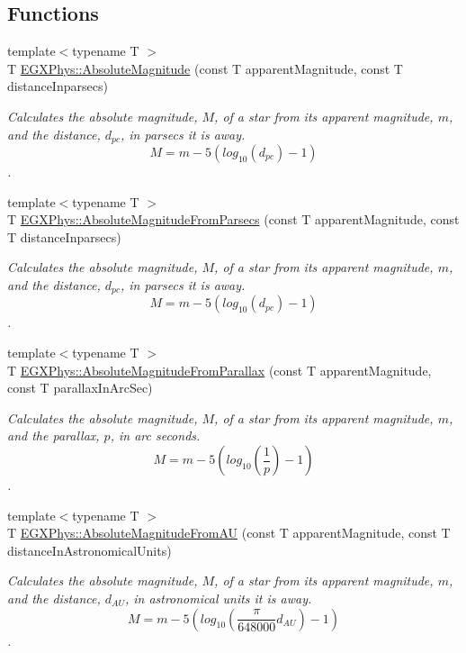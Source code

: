 \subsection*{Functions}
\begin{DoxyCompactItemize}
\item 
{\footnotesize template$<$typename T $>$ }\\T \mbox{\hyperlink{group___e_g_x_phys-_astrophysics-_absolute_magnitude_ga2ddb255fa28972334d82f377ce182048}{E\+G\+X\+Phys\+::\+Absolute\+Magnitude}} (const T apparent\+Magnitude, const T distance\+Inparsecs)
\begin{DoxyCompactList}\small\item\em Calculates the absolute magnitude, $M$, of a star from its apparent magnitude, $m$, and the distance, $d_{pc}$, in parsecs it is away. \[M= m - 5 \left ( log_{10}(d_{pc}) - 1 \right )\]. \end{DoxyCompactList}\item 
{\footnotesize template$<$typename T $>$ }\\T \mbox{\hyperlink{group___e_g_x_phys-_astrophysics-_absolute_magnitude_ga6eb3d93ce8d6ff1e0cc288059225ff9a}{E\+G\+X\+Phys\+::\+Absolute\+Magnitude\+From\+Parsecs}} (const T apparent\+Magnitude, const T distance\+Inparsecs)
\begin{DoxyCompactList}\small\item\em Calculates the absolute magnitude, $M$, of a star from its apparent magnitude, $m$, and the distance, $d_{pc}$, in parsecs it is away. \[M= m - 5 \left ( log_{10}(d_{pc}) - 1 \right )\]. \end{DoxyCompactList}\item 
{\footnotesize template$<$typename T $>$ }\\T \mbox{\hyperlink{group___e_g_x_phys-_astrophysics-_absolute_magnitude_ga057faec7c22e76e31ad65bf2f98e0d58}{E\+G\+X\+Phys\+::\+Absolute\+Magnitude\+From\+Parallax}} (const T apparent\+Magnitude, const T parallax\+In\+Arc\+Sec)
\begin{DoxyCompactList}\small\item\em Calculates the absolute magnitude, $M$, of a star from its apparent magnitude, $m$, and the parallax, $p$, in arc seconds. \[M= m - 5 \left ( log_{10} \left ( \dfrac{1}{p} \right ) - 1 \right )\]. \end{DoxyCompactList}\item 
{\footnotesize template$<$typename T $>$ }\\T \mbox{\hyperlink{group___e_g_x_phys-_astrophysics-_absolute_magnitude_gab25029a422f98bc7f8cea59abce3860e}{E\+G\+X\+Phys\+::\+Absolute\+Magnitude\+From\+AU}} (const T apparent\+Magnitude, const T distance\+In\+Astronomical\+Units)
\begin{DoxyCompactList}\small\item\em Calculates the absolute magnitude, $M$, of a star from its apparent magnitude, $m$, and the distance, $d_{AU}$, in astronomical units it is away. \[M= m - 5 \left ( log_{10} \left ( \dfrac{\pi}{648000}d_{AU} \right ) - 1 \right )\]. \end{DoxyCompactList}\end{DoxyCompactItemize}


